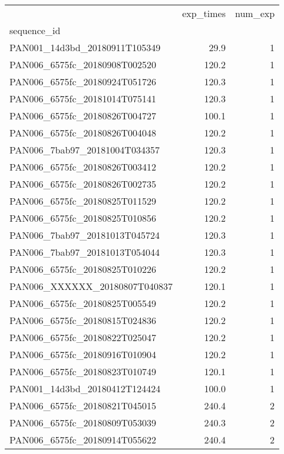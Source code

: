 \begin{tabular}{lrr}
\toprule
{} &  exp\_times &  num\_exp \\
sequence\_id                   &            &          \\
\midrule
PAN001\_14d3bd\_20180911T105349 &       29.9 &        1 \\
PAN006\_6575fc\_20180908T002520 &      120.2 &        1 \\
PAN006\_6575fc\_20180924T051726 &      120.3 &        1 \\
PAN006\_6575fc\_20181014T075141 &      120.3 &        1 \\
PAN006\_6575fc\_20180826T004727 &      100.1 &        1 \\
PAN006\_6575fc\_20180826T004048 &      120.2 &        1 \\
PAN006\_7bab97\_20181004T034357 &      120.3 &        1 \\
PAN006\_6575fc\_20180826T003412 &      120.2 &        1 \\
PAN006\_6575fc\_20180826T002735 &      120.2 &        1 \\
PAN006\_6575fc\_20180825T011529 &      120.2 &        1 \\
PAN006\_6575fc\_20180825T010856 &      120.2 &        1 \\
PAN006\_7bab97\_20181013T045724 &      120.3 &        1 \\
PAN006\_7bab97\_20181013T054044 &      120.3 &        1 \\
PAN006\_6575fc\_20180825T010226 &      120.2 &        1 \\
PAN006\_XXXXXX\_20180807T040837 &      120.1 &        1 \\
PAN006\_6575fc\_20180825T005549 &      120.2 &        1 \\
PAN006\_6575fc\_20180815T024836 &      120.2 &        1 \\
PAN006\_6575fc\_20180822T025047 &      120.2 &        1 \\
PAN006\_6575fc\_20180916T010904 &      120.2 &        1 \\
PAN006\_6575fc\_20180823T010749 &      120.1 &        1 \\
PAN001\_14d3bd\_20180412T124424 &      100.0 &        1 \\
PAN006\_6575fc\_20180821T045015 &      240.4 &        2 \\
PAN006\_6575fc\_20180809T053039 &      240.3 &        2 \\
PAN006\_6575fc\_20180914T055622 &      240.4 &        2 \\

\end{tabular}
